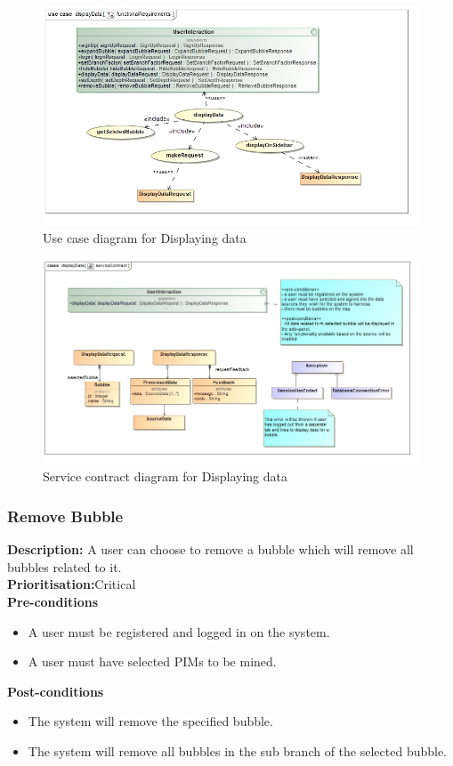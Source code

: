 \documentclass[hidelinks,english]{article}
\begin{document}
			\begin{figure}[!h]
    			\includegraphics[width=\linewidth]{functionalRequirementsDisplayData.jpg}
    			\caption{Use case diagram for Displaying data}
    			\label{UseCaseDisplayData}
    			\end{figure}
    			
    			\begin{figure}[!h]
    			\includegraphics[width=\linewidth]{serviceContractDisplayData.jpg}
    			\caption{Service contract diagram for Displaying data}
    			\label{ServiceContractDisplayData}
    			\end{figure}
				
    		\subsubsection{Remove Bubble}
				\textbf{Description:}  A user can choose to remove a bubble which will remove all bubbles related to it.\\
			    \textbf{Prioritisation:}Critical\\
     			\textbf{Pre-conditions}
				\begin{itemize}
					\item A user must be registered and logged in on the system.
					\item A user must have selected PIMs to be mined.
				\end{itemize}
    			\textbf{Post-conditions}
     			\begin{itemize}
			        \item The system will remove the specified bubble.
			        \item The system will remove all bubbles in the sub branch of the selected bubble.
    			\end{itemize}
    			
\end{document}
